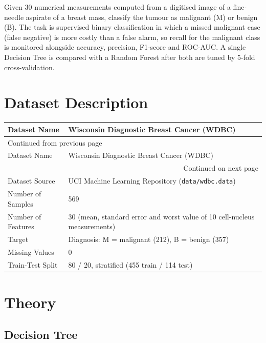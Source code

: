 \documentclass[11pt]{article}
\begin{document}
Given 30 numerical measurements computed from a digitised image of a fine-needle aspirate of
a breast mass, classify the tumour as malignant (M) or benign (B). The task is supervised
binary classification in which a missed malignant case (false negative) is more costly than
a false alarm, so recall for the malignant class is monitored alongside accuracy, precision,
F1-score and ROC-AUC. A single Decision Tree is compared with a Random Forest after both are
tuned by 5-fold cross-validation.

\section*{Dataset Description}
\label{sec:org880ffce}


\begin{longtable}{|p{4cm}|p{11cm}|}
\hline
Dataset Name & Wisconsin Diagnostic Breast Cancer (WDBC)\\[0pt]
\hline
\endfirsthead
\multicolumn{2}{l}{Continued from previous page} \\[0pt]
\hline

Dataset Name & Wisconsin Diagnostic Breast Cancer (WDBC) \\[0pt]

\hline
\endhead
\hline\multicolumn{2}{r}{Continued on next page} \\
\endfoot
\endlastfoot
\hline
Dataset Source & UCI Machine Learning Repository (\texttt{data/wdbc.data})\\[0pt]
\hline
Number of Samples & 569\\[0pt]
\hline
Number of Features & 30 (mean, standard error and worst value of 10 cell-nucleus measurements)\\[0pt]
\hline
Target & Diagnosis: M = malignant (212), B = benign (357)\\[0pt]
\hline
Missing Values & 0\\[0pt]
\hline
Train-Test Split & 80 / 20, stratified (455 train / 114 test)\\[0pt]
\hline
\end{longtable}

\section*{Theory}
\label{sec:org8d22acc}


\subsection*{Decision Tree}
\label{sec:org6140ecc}
\end{document}
